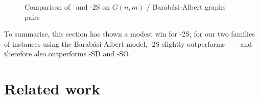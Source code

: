 \begin{figure}[htb]
    \centering
    \caption{Comparison of \McSplit\ and \McSplit-2S on $G(n,m)$ / Barabási-Albert graphs pairs}
    \label{figure:mcsplit-vs-mcsplit2-ba-gnm}
\end{figure}

To summarise, this section has shown a modest win for \McSplit-2S; for our two families of
instances using the Barabási-Albert model, \McSplit-2S slightly outperforms \McSplit\ --- and therefore
also outperforms \McSplit-SD and \McSplit-SO.


\section{Related work}\label{sec:swapping-related-work}

